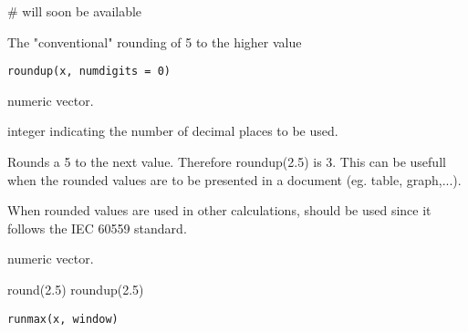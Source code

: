 \documentclass[a4paper]{book}
\begin{document}
%
\begin{Examples}
\begin{ExampleCode}
# will soon be available
\end{ExampleCode}
\end{Examples}
\newpage
{}
%
\begin{Description}\relax
The "conventional" rounding of 5 to the higher value
\end{Description}
%
\begin{Usage}
\begin{verbatim}
roundup(x, numdigits = 0)
\end{verbatim}
\end{Usage}
%
\begin{Arguments}
\begin{ldescription}
\item[\code{x}] numeric vector.
\item[\code{digits}] integer indicating the number of decimal places to be used.
\end{ldescription}
\end{Arguments}
%
\begin{Details}\relax

Rounds a 5 to the next value. Therefore roundup(2.5) is 3.
This can be usefull when the rounded values are to be presented in a document (eg. table, graph,...).

When rounded values are used in other calculations,  should be
used since it follows the IEC 60559 standard.
\end{Details}
%
\begin{Value}
numeric vector.
\end{Value}
%
\begin{SeeAlso}\relax
{}
\end{SeeAlso}
%
\begin{Examples}
\begin{ExampleCode}
round(2.5)
roundup(2.5)
\end{ExampleCode}
\end{Examples}
\newpage
{}
%
\begin{Usage}
\begin{verbatim}
runmax(x, window)
\end{verbatim}
\end{Usage}
%
\begin{Arguments}
\begin{ldescription}
\item[\code{x}] 


\item[\code{window}] 


\end{ldescription}
\end{Arguments}
\end{document}
